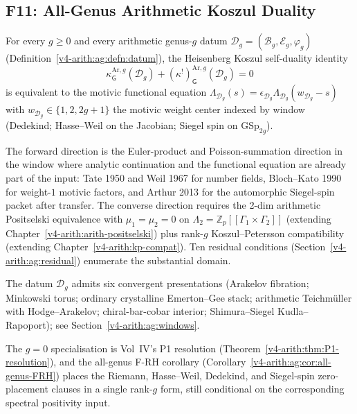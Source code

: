 \subsection{F11: All-Genus Arithmetic Koszul Duality}
\label{v4-arith:of:F11-all-genus}

\begin{conjecture}
\label{v4-arith:conj:F11-all-genus}
For every \(g\geq 0\) and every arithmetic genus-\(g\) datum
\(\mathcal{D}_g=(\mathcal{B}_g,\mathcal{E}_g,\varphi_g)\)
(Definition~\ref{v4-arith:ag:defn:datum}), the Heisenberg Koszul self-duality
identity
\[
\kappa^{\mathrm{Ar},g}_{\mathsf{G}}(\mathcal{D}_g)+(\kappa^{!})^{\mathrm{Ar},g}_{\mathsf{G}}(\mathcal{D}_g)=0
\]
is equivalent to the motivic functional equation
\(\Lambda_{\mathcal{D}_g}(s)=\epsilon_{\mathcal{D}_g}\Lambda_{\mathcal{D}_g}(w_{\mathcal{D}_g}-s)\)
with \(w_{\mathcal{D}_g}\in\{1,2,2g+1\}\) the motivic weight center
indexed by window (Dedekind; Hasse--Weil on the Jacobian; Siegel spin
on \(\mathrm{GSp}_{2g}\)).
\end{conjecture}

\begin{remark}[form]
The forward direction is the Euler-product and Poisson-summation
direction in the window where analytic continuation and the functional
equation are already part of the input: Tate 1950 and Weil 1967 for
number fields, Bloch--Kato 1990 for weight-\(1\) motivic factors, and
Arthur 2013 for the automorphic Siegel-spin packet after transfer.
The converse direction requires the 2-dim arithmetic Positselski equivalence with
\(\mu_1=\mu_2=0\) on \(\Lambda_2=\mathbb{Z}_p[[\Gamma_1\times\Gamma_2]]\)
(extending Chapter~\ref{v4-arith:arith-positselski}) plus rank-\(g\)
Koszul--Petersson compatibility (extending Chapter~\ref{v4-arith:kp-compat}).
Ten residual conditions (Section~\ref{v4-arith:ag:residual}) enumerate the
substantial domain.

The datum \(\mathcal{D}_g\) admits
six convergent presentations (Arakelov fibration; Minkowski torus;
ordinary crystalline Emerton--Gee stack; arithmetic Teichmüller with
Hodge--Arakelov; chiral-bar-cobar interior; Shimura--Siegel
Kudla--Rapoport); see Section~\ref{v4-arith:ag:windows}.

The \(g=0\) specialisation is
Vol~IV's P1 resolution (Theorem~\ref{v4-arith:thm:P1-resolution}), and the
all-genus F-RH corollary (Corollary~\ref{v4-arith:ag:cor:all-genus-FRH})
places the Riemann, Hasse--Weil, Dedekind, and Siegel-spin
zero-placement clauses in a single rank-\(g\) form, still conditional
on the corresponding spectral positivity input.
\end{remark}

